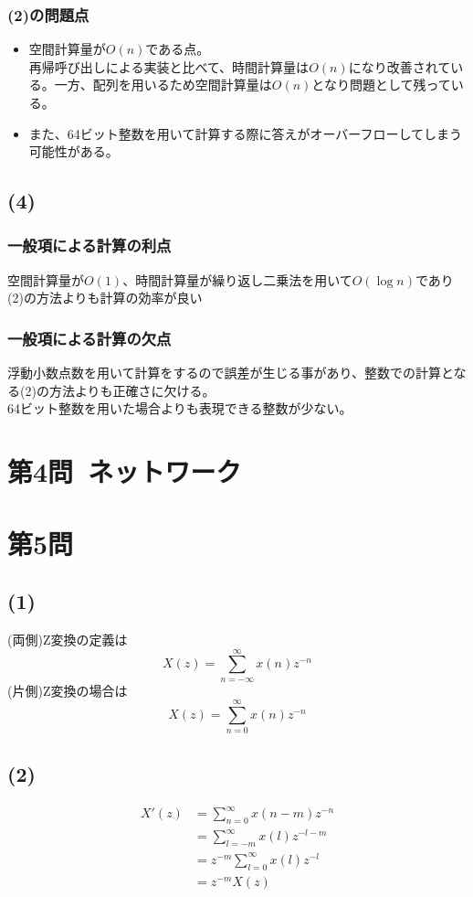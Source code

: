\documentclass[a4paper,12pt,xelatex,ja=standard]{bxjsarticle}
\begin{document}
    \subsubsection*{(2)の問題点}
    \begin{itemize}
      \item 空間計算量が\(O(n)\)である点。\\
        再帰呼び出しによる実装と比べて、時間計算量は\(O(n)\)になり改善されている。一方、配列を用いるため空間計算量は\(O(n)\)となり問題として残っている。
      \item また、64ビット整数を用いて計算する際に答えがオーバーフローしてしまう可能性がある。
    \end{itemize}

  \subsection*{(4)}
    \subsubsection*{一般項による計算の利点}
    空間計算量が\(O(1)\)、時間計算量が繰り返し二乗法を用いて\(O(\log n)\)であり(2)の方法よりも計算の効率が良い
    \subsubsection*{一般項による計算の欠点}
    浮動小数点数を用いて計算をするので誤差が生じる事があり、整数での計算となる(2)の方法よりも正確さに欠ける。\\
    64ビット整数を用いた場合よりも表現できる整数が少ない。

\section*{第4問\ ネットワーク}

\section*{第5問\ }
  \subsection*{(1)}
  (両側)Z変換の定義は
  \[
    X(z) = \sum^{\infty}_{n=-\infty}x(n) z^{-n}
  \]
  (片側)Z変換の場合は
  \[
    X(z) = \sum^{\infty}_{n=0}x(n) z^{-n}
  \]

  \subsection*{(2)}
  \begin{equation*}
    \begin{split}
      X'(z) &= \sum^{\infty}_{n=0}x(n-m)z^{-n} \\
            &= \sum^{\infty}_{l=-m}x(l)z^{-l-m} \\
            &= z^{-m} \sum^{\infty}_{l=0}x(l)z^{-l} \\
            &= z^{-m} X(z)
    \end{split}
  \end{equation*}
\end{document}
